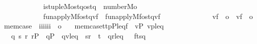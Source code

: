 \begin{isabellebody}
\ \ \ \ \ \ \ \ \ \ \ \ \ is{\isacharunderscore}{\kern0pt}tuple{\isacharparenleft}{\kern0pt}M{\isacharcomma}{\kern0pt}o{\isacharcomma}{\kern0pt}s{\isacharcomma}{\kern0pt}t{}{\isacharcomma}{\kern0pt}q{\isacharcomma}{\kern0pt}ost{}q{\isacharparenright}{\kern0pt}\ {\isasymand}\ number{}{\isacharparenleft}{\kern0pt}M{\isacharcomma}{\kern0pt}o{\isacharparenright}{\kern0pt}\ {\isasymand}\isanewline
\ \ \ \ \ \ \ \ \ \ \ \ \ fun{\isacharunderscore}{\kern0pt}apply{\isacharparenleft}{\kern0pt}M{\isacharcomma}{\kern0pt}f{\isacharcomma}{\kern0pt}ost{}q{\isacharcomma}{\kern0pt}vf{}{\isacharparenright}{\kern0pt}\ {\isasymand}\ fun{\isacharunderscore}{\kern0pt}apply{\isacharparenleft}{\kern0pt}M{\isacharcomma}{\kern0pt}f{\isacharcomma}{\kern0pt}ost{}q{\isacharcomma}{\kern0pt}vf{}{\isacharparenright}{\kern0pt}\ {\isasymand}\isanewline
\ \ \ \ \ \ \ \ \ \ \ \ \ {\isacharparenleft}{\kern0pt}vf{}\ {\isacharequal}{\kern0pt}\ o\ {\isasymlongleftrightarrow}\ vf{}\ {\isacharequal}{\kern0pt}\ o{\isacharparenright}{\kern0pt}{\isacharparenright}{\kern0pt}{\isacharparenright}{\kern0pt}{\isachardoublequoteclose}\isanewline
\isanewline
\isanewline
{}\isamarkupfalse%
\isanewline
\ \ mem{\isacharunderscore}{\kern0pt}case\ {\isacharcolon}{\kern0pt}{\isacharcolon}{\kern0pt}\ {\isachardoublequoteopen}{\isacharbrackleft}{\kern0pt}i{\isacharcomma}{\kern0pt}i{\isacharcomma}{\kern0pt}i{\isacharcomma}{\kern0pt}i{\isacharcomma}{\kern0pt}i{\isacharcomma}{\kern0pt}i{\isacharbrackright}{\kern0pt}\ {\isasymRightarrow}\ o{\isachardoublequoteclose}\ \isanewline
\ \ {\isachardoublequoteopen}mem{\isacharunderscore}{\kern0pt}case{\isacharparenleft}{\kern0pt}t{}{\isacharcomma}{\kern0pt}t{}{\isacharcomma}{\kern0pt}p{\isacharcomma}{\kern0pt}P{\isacharcomma}{\kern0pt}leq{\isacharcomma}{\kern0pt}f{\isacharparenright}{\kern0pt}\ {\isasymequiv}\ {\isasymforall}v{\isasymin}P{\isachardot}{\kern0pt}\ {\isasymlangle}v{\isacharcomma}{\kern0pt}p{\isasymrangle}{\isasymin}leq\ {\isasymlongrightarrow}\isanewline
\ \ \ \ {\isacharparenleft}{\kern0pt}{\isasymexists}q{\isachardot}{\kern0pt}\ {\isasymexists}s{\isachardot}{\kern0pt}\ {\isasymexists}r{\isachardot}{\kern0pt}\ r{\isasymin}P\ {\isasymand}\ q{\isasymin}P\ {\isasymand}\ {\isasymlangle}q{\isacharcomma}{\kern0pt}v{\isasymrangle}{\isasymin}leq\ {\isasymand}\ {\isasymlangle}s{\isacharcomma}{\kern0pt}r{\isasymrangle}\ {\isasymin}\ t{}\ {\isasymand}\ {\isasymlangle}q{\isacharcomma}{\kern0pt}r{\isasymrangle}{\isasymin}leq\ {\isasymand}\ \ f{\isacharbackquote}{\kern0pt}{\isasymlangle}{}{\isacharcomma}{\kern0pt}t{}{\isacharcomma}{\kern0pt}s{\isacharcomma}{\kern0pt}q{\isasymrangle}\ {\isacharequal}{\kern0pt}\ {}{\isacharparenright}{\kern0pt}{\isachardoublequoteclose}\isanewline

\end{isabellebody}
